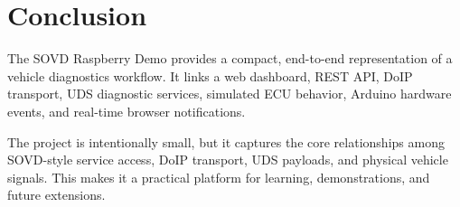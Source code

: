 \documentclass[a4paper,10pt,titlepage,oneside]{article}
\begin{document}
\section{Conclusion}

The SOVD Raspberry Demo provides a compact, end-to-end representation of a
vehicle diagnostics workflow. It links a web dashboard, REST API, DoIP transport,
UDS diagnostic services, simulated ECU behavior, Arduino hardware events, and
real-time browser notifications.

The project is intentionally small, but it captures the core relationships among
SOVD-style service access, DoIP transport, UDS payloads, and physical vehicle
signals. This makes it a practical platform for learning, demonstrations, and
future extensions.
\end{document}
